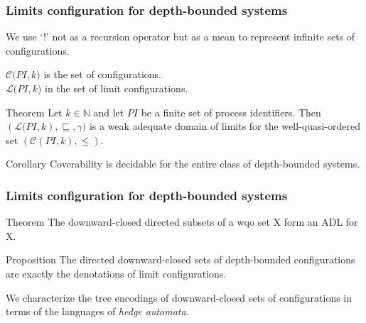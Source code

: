 \documentclass{beamer}
\begin{document}
\begin{frame}
  \frametitle{Limits configuration for depth-bounded systems}
  We use \alert{`!'} not as a recursion operator but as a mean to represent infinite sets of configurations.

  \vspace{10pt}

  \alert{$\mathcal{C(}PI , k)$} is the set of configurations.\\
  \alert{$\mathcal{L(}PI , k)$} in the set of limit configurations.

  \begin{block}{Theorem}
  Let $k \in \mathbb{N}$ and let $PI$ be a finite set of process identifiers.
  Then $(\mathcal{L(}PI , k), \sqsubseteq, \gamma)$ is a weak adequate domain of limits
  for the well-quasi-ordered set $(\mathcal{C}(PI , k), \leq)$.
  \end{block}

  \begin{block}{Corollary}
  Coverability is decidable for the entire class of depth-bounded systems.
  \end{block}

\end{frame}

\begin{frame}
  \frametitle{Limits configuration for depth-bounded systems}
  \begin{block}{Theorem \cite{FinkelGoubaultLarrecq09ForwardAnalysisForWSTS}}
  The downward-closed directed subsets of a wqo set X form an ADL for X.
  \end{block}

  \begin{center}
  \end{center}

  \begin{block}{Proposition}
  The directed downward-closed sets of depth-bounded configurations are exactly the denotations of limit configurations.
  \end{block}

  We characterize the tree encodings of downward-closed sets of configurations in terms of the languages of \emph{hedge automata}.
\end{frame}
\end{document}
